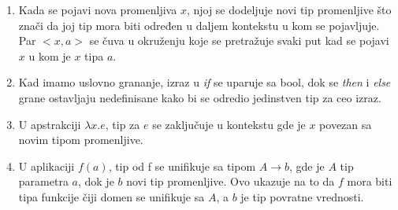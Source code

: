 \begin{enumerate}
	\item Kada se pojavi nova promenljiva $x$, njoj se dodeljuje novi tip promenljive što znači da joj tip mora biti određen u daljem kontekstu u kom se pojavljuje. Par $<x, a>$ se čuva u okruženju koje se pretražuje svaki put kad se pojavi $x$ u kom je $x$ tipa $a$.
	
	\item Kad imamo uslovno grananje, izraz u \textit{if} se uparuje sa bool, dok se \textit{then} i \textit{else} grane ostavljaju nedefinisane kako bi se odredio jedinstven tip za ceo izraz.
	
	\item U apstrakciji $\lambda x.e$, tip za $e$ se zaključuje u kontekstu gde je $x$ povezan sa novim tipom promenljive.
	
	\item U aplikaciji $f(a)$, tip od f se unifikuje sa tipom $A \longrightarrow b$, gde je $A$ tip parametra $a$, dok je $b$ novi tip promenljive. Ovo ukazuje na to da $f$ mora biti tipa funkcije čiji domen se unifikuje sa $A$, a $b$ je tip povratne vrednosti.
\end{enumerate}



